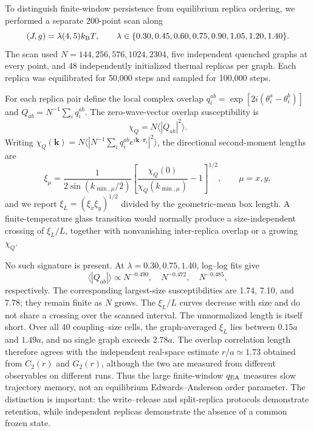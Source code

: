 \documentclass[aps,prl,onecolumn,superscriptaddress,nofootinbib]{revtex4-2}
\begin{document}
To distinguish finite-window persistence from equilibrium replica ordering,
we performed a separate 200-point scan along
\begin{equation}
 (J,g)=\lambda(4,5)k_{\rm B}T,
 \qquad
 \lambda\in\{0.30,0.45,0.60,0.75,0.90,1.05,1.20,1.40\}.
 \label{eq:supp-ray}
\end{equation}
The scan used \(N=144,256,576,1024,2304\), five independent quenched graphs
at every point, and 48 independently initialized thermal replicas per graph.
Each replica was equilibrated for 50,000 steps and sampled for 100,000 steps.

For each replica pair define the local complex overlap
\(q_i^{ab}=\exp[2i(\theta_i^a-\theta_i^b)]\) and
\(Q_{ab}=N^{-1}\sum_iq_i^{ab}\).  The zero-wave-vector overlap
susceptibility is
\begin{equation}
 \chi_Q=N\langle|Q_{ab}|^2\rangle.
 \label{eq:supp-chiq}
\end{equation}
Writing \(\chi_Q(\bm k)=N\langle|N^{-1}\sum_iq_i^{ab}
e^{i\bm k\cdot\bm r_i}|^2\rangle\), the directional second-moment lengths are
\begin{equation}
 \xi_\mu=\frac{1}{2\sin(k_{\min,\mu}/2)}
 \left[\frac{\chi_Q(0)}{\chi_Q(k_{\min,\mu})}-1\right]^{1/2},
 \qquad \mu=x,y,
 \label{eq:supp-xi}
\end{equation}
and we report \(\xi_L=(\xi_x\xi_y)^{1/2}\) divided by the geometric-mean box
length.  A finite-temperature glass transition would normally produce a
size-independent crossing of \(\xi_L/L\), together with nonvanishing
inter-replica overlap or a growing \(\chi_Q\).

No such signature is present.  At \(\lambda=0.30,0.75,1.40\), log--log fits
give
\begin{equation}
 \langle|Q_{ab}|\rangle\propto
 N^{-0.490},\quad N^{-0.472},\quad N^{-0.485},
 \label{eq:supp-overlap-exponents}
\end{equation}
respectively.  The corresponding largest-size susceptibilities are 1.74,
7.10, and 7.78; they remain finite as \(N\) grows.  The \(\xi_L/L\) curves
decrease with size and do not share a crossing over the scanned interval.
The unnormalized length is itself short.  Over all 40 coupling--size cells,
the graph-averaged \(\xi_L\) lies between \(0.15a\) and \(1.49a\), and no
single graph exceeds \(2.78a\).  The overlap correlation length therefore
agrees with the independent real-space estimate \(r/a\simeq1.73\) obtained
from \(C_2(r)\) and \(G_2(r)\), although the two are measured from different
observables on different runs.
Thus the large finite-window \(q_{\rm EA}\) measures slow trajectory memory,
not an equilibrium Edwards--Anderson order parameter.  The distinction is
important: the write--release and split-replica protocols demonstrate
retention, while independent replicas demonstrate the absence of a common
frozen state.
\end{document}
